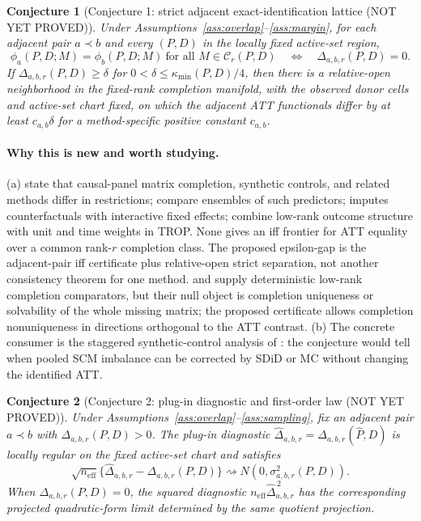 \documentclass[11pt]{article}
\theoremstyle{definition}
\theoremstyle{plain}
\newtheorem{conjecture}{Conjecture}
\theoremstyle{remark}
\begin{document}
\begin{conjecture}[Conjecture 1: strict adjacent exact-identification lattice (NOT YET PROVED)]\label{conj:lattice}
Under Assumptions~\ref{ass:overlap}--\ref{ass:margin}, for each adjacent
pair $a\prec b$ and every $(P,D)$ in the locally fixed active-set region,
\[
  \phi_a(P,D;M)=\phi_b(P,D;M)\ \text{for all }M\in\mathcal C_r(P,D)
  \quad\Longleftrightarrow\quad
  \Delta_{a,b,r}(P,D)=0.
\]
If $\Delta_{a,b,r}(P,D)\ge\delta$ for
$0<\delta\le\kappa_{\min}(P,D)/4$, then there is a relative-open
neighborhood in the fixed-rank completion manifold, with the observed donor
cells and active-set chart fixed, on which the adjacent ATT functionals differ
by at least $c_{a,b}\delta$ for a method-specific positive constant $c_{a,b}$.
\end{conjecture}
\paragraph{Why this is new and worth studying.}
(a) \citet[Sections~2--3]{AtheyBayatiDoudchenkoImbensKhosravi2021} state that
causal-panel matrix completion, synthetic controls, and related methods differ
in restrictions; \citet[Section~2]{AtheyBayatiImbensQu2019} compare ensembles
of such predictors; \citet[Sections~2--3]{Xu2017} imputes counterfactuals
with interactive fixed effects; \citet[arXiv v3 abstract and Section~2 estimator definition]{AtheyImbensQuViviano2025}
combine low-rank outcome structure with unit and time weights in TROP. None
gives an iff frontier for ATT equality over a common rank-$r$ completion
class. The proposed epsilon-gap is the adjacent-pair iff certificate plus
relative-open strict separation, not another consistency theorem for one
method. \citet{SingerCucuringu2010} and \citet{Chatterjee2020} supply
deterministic low-rank completion comparators, but their null object is
completion uniqueness or solvability of the whole missing matrix; the proposed
certificate allows completion nonuniqueness in directions orthogonal to the
ATT contrast.
(b) The concrete consumer is the staggered synthetic-control
analysis of \citet{BenMichaelFellerRothstein2022}: the conjecture would tell
when pooled SCM imbalance can be corrected by SDiD or MC without changing the
identified ATT.

\begin{conjecture}[Conjecture 2: plug-in diagnostic and first-order law (NOT YET PROVED)]\label{conj:plugin}
Under Assumptions~\ref{ass:overlap}--\ref{ass:sampling}, fix an adjacent
pair $a\prec b$ with $\Delta_{a,b,r}(P,D)>0$. The plug-in diagnostic
$\widehat\Delta_{a,b,r}=\Delta_{a,b,r}(\widehat P,D)$ is locally regular on
the fixed active-set chart and satisfies
\[
  \sqrt{n_{\mathrm{eff}}}
  \{\widehat\Delta_{a,b,r}-\Delta_{a,b,r}(P,D)\}
  \rightsquigarrow
  N(0,\sigma^2_{a,b,r}(P,D)).
\]
When $\Delta_{a,b,r}(P,D)=0$, the squared diagnostic
$n_{\mathrm{eff}}\widehat\Delta_{a,b,r}^{\,2}$ has the corresponding
projected quadratic-form limit determined by the same quotient projection.
\end{conjecture}
\end{document}
